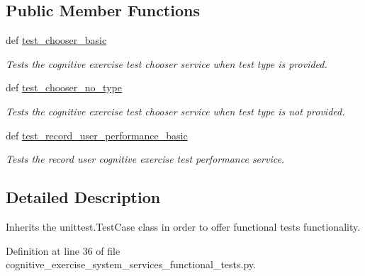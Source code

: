 \subsection*{Public Member Functions}
\begin{DoxyCompactItemize}
\item 
def \hyperlink{classcognitive__exercise__system__services__functional__tests_1_1CognitiveExerciseFunc_a287a720d8fbe9a1a2f375cae695353ab}{test\-\_\-chooser\-\_\-basic}
\begin{DoxyCompactList}\small\item\em Tests the cognitive exercise test chooser service when test type is provided. \end{DoxyCompactList}\item 
def \hyperlink{classcognitive__exercise__system__services__functional__tests_1_1CognitiveExerciseFunc_a40cbd2c6dee3d8c707e470663c09c86f}{test\-\_\-chooser\-\_\-no\-\_\-type}
\begin{DoxyCompactList}\small\item\em Tests the cognitive exercise test chooser service when test type is not provided. \end{DoxyCompactList}\item 
def \hyperlink{classcognitive__exercise__system__services__functional__tests_1_1CognitiveExerciseFunc_a3acf48c7deadcfd227fd3378b03e81d5}{test\-\_\-record\-\_\-user\-\_\-performance\-\_\-basic}
\begin{DoxyCompactList}\small\item\em Tests the record user cognitive exercise test performance service. \end{DoxyCompactList}\end{DoxyCompactItemize}


\subsection{Detailed Description}
Inherits the unittest.\-Test\-Case class in order to offer functional tests functionality. 

Definition at line 36 of file cognitive\-\_\-exercise\-\_\-system\-\_\-services\-\_\-functional\-\_\-tests.\-py.



